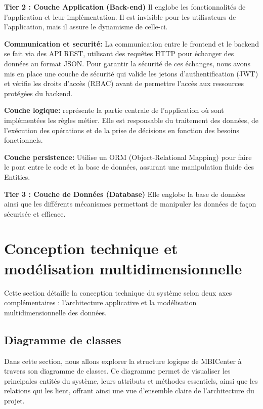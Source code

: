 \vspace{0.3cm}

\noindent\textbf{Tier 2 : Couche Application (Back-end)}\newline
Il englobe les fonctionnalités de l'application et leur implémentation. Il est invisible pour les utilisateurs de l'application, mais il assure le dynamisme de celle-ci.

\vspace{0.3cm}

\noindent\textbf{Communication et securité:} La communication entre le frontend et le backend se fait via des API REST, utilisant des requêtes HTTP pour échanger des données au format JSON. Pour garantir la sécurité de ces échanges, nous avons mis en place une couche de sécurité qui valide les jetons d'authentification (JWT) et vérifie les droits d'accès (RBAC) avant de permettre l'accès aux ressources protégées du backend.

\vspace{0.3cm}

\noindent\textbf{Couche logique:} 
représente la partie centrale de l'application où sont implémentées les règles métier. Elle est responsable du traitement des données, de l'exécution des opérations et de la prise de décisions en fonction des besoins fonctionnels.

\vspace{0.3cm}

\noindent\textbf{Couche persistence:} Utilise un ORM (Object-Relational Mapping) pour faire le pont entre le code et la base de données, assurant une manipulation fluide des Entities.\newline

\noindent\textbf{Tier 3 : Couche de Données (Database)}\newline
Elle englobe la base de données ainsi que les différents mécanismes permettant de manipuler les données de façon sécurisée et efficace.
\newline

\section{Conception technique et modélisation multidimensionnelle}
\label{sec:Conception technique et modélisation multidimensionnelle}
Cette section détaille la conception technique du système selon deux axes complémentaires : l'architecture applicative et la modélisation multidimensionnelle des données.
\subsection{Diagramme de classes}
Dans cette section, nous allons explorer la structure logique de MBICenter à travers son diagramme de classes. Ce diagramme permet de visualiser les principales entités du système, leurs attributs et méthodes essentiels, ainsi que les relations qui les lient, offrant ainsi une vue d'ensemble claire de l'architecture du projet.


